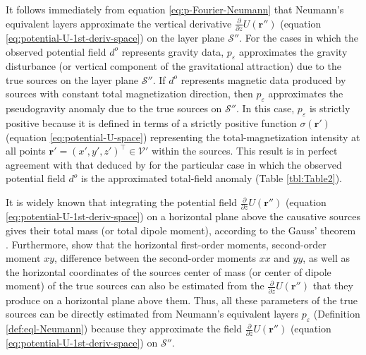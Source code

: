 It follows immediately from equation \ref{eq:p-Fourier-Neumann} that Neumann's equivalent layers approximate 
the vertical derivative $\tfrac{\partial}{\partial z} U(\mathbf{r}'')$ (equation \ref{eq:potential-U-1st-deriv-space}) 
on the layer plane $\mathcal{S}''$.
For the cases in which the observed potential field $d^{o}$ represents gravity data, 
$p_{\varepsilon}$ approximates the gravity disturbance (or vertical component of the gravitational
attraction) due to the true sources on the layer plane $\mathcal{S}''$.
If $d^{o}$ represents magnetic data produced by sources with constant total magnetization direction, 
then $p_{\varepsilon}$ approximates the pseudogravity 
anomaly \citep[][ p. 345]{blakely1996} due to the true sources on $\mathcal{S}''$.
In this case, $p_{\varepsilon}$ is strictly positive because it is defined in terms of a strictly positive 
function $\sigma(\mathbf{r}')$ (equation \ref{eq:potential-U-space}) representing the 
total-magnetization intensity at all points $\mathbf{r}' = (x', y', z')^{\top} \in \mathcal{V}'$ 
within the sources.
This result is in perfect agreement with that deduced by \citet{reis_etal2020} for
the particular case in which the observed potential field $d^{o}$ is
the approximated total-field anomaly (Table \ref{tbl:Table2}).

It is widely known that integrating the potential field $\tfrac{\partial}{\partial z} U(\mathbf{r}'')$ 
(equation \ref{eq:potential-U-1st-deriv-space}) on a horizontal plane above the causative sources
gives their total mass (or total dipole moment), according to the
Gauss' theorem \citep[e.g.,][]{hammer1945, lafehr1965, bhattacharyya1967}. 
Furthermore, \citet{medeiros-silva1995a} show that the horizontal first-order moments, second-order moment $xy$, 
difference between the second-order moments $xx$ and $yy$, as well as the horizontal coordinates of the sources center of mass
(or center of dipole moment) of the true sources can also be estimated from the $\tfrac{\partial}{\partial z} U(\mathbf{r}'')$
that they produce on a horizontal plane above them.
Thus, all these parameters of the true sources can be directly estimated from 
Neumann's equivalent layers $p_{\varepsilon}$ (Definition \ref{def:eql-Neumann}) because
they approximate the field $\tfrac{\partial}{\partial z} U(\mathbf{r}'')$ (equation \ref{eq:potential-U-1st-deriv-space}) 
on $\mathcal{S}''$.